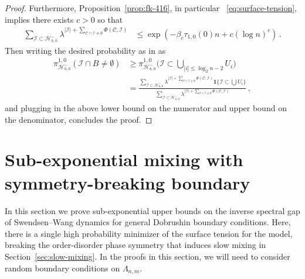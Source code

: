 \documentclass[reqno,11pt]{amsart}
\numberwithin{equation}{section}
\theoremstyle{definition}{
\newtheorem{example}[theorem]{Example}
\newtheorem{definition}[theorem]{Definition}
\newtheorem*{definition*}{Definition}
\newtheorem{problem}[theorem]{Problem}
\newtheorem{question}[theorem]{Question}
\newtheorem{remark}[theorem]{Remark}
}
\begin{document}
\begin{proof}
Furthermore, Proposition~\ref{prop:fk-416}, in particular ~\eqref{eq:surface-tension}, implies there exists $c>0$ so that
\begin{align*}
\sum _{\mathcal I \subset \mathcal H_{h,0}^-} \lambda^{|\mathcal I|+\sum_{\mathcal C\cap \mathcal I \neq \emptyset} \Phi(\mathcal C,\mathcal I)} & 
\leq \exp( -\beta_c \tau_{1,0}(0) n+ c(\log n)^c)\,.
\end{align*}
Then writing the desired probability as in \cite[(A.36)]{MaTo10} as
\begin{align*}
\pi_{\mathcal H^-_{h,0}}^{1,0}\left(\mathcal I \cap B \neq\emptyset\right) & \geq \pi_{\mathcal H^-_{h,0}}^{1,0} \Big(\mbox{$\mathcal I \subset \bigcup_{|i|\leq \log_2 n-2} U_i $}\Big) \\
& = \frac {\sum_{\mathcal I\subset \mathcal H^-_{h,0}} \lambda^{|\mathcal I|+\sum_{\mathcal C\cap \mathcal I \neq \emptyset} \Phi(\mathcal C,\mathcal I)}\boldsymbol 1\{\mathcal I \subset \bigcup U_i\}}{\sum_{\mathcal I\subset \mathcal H^-_{h,0}} \lambda^{|\mathcal I|+\sum_{\mathcal C\cap \mathcal I \neq \emptyset} \Phi(\mathcal C,\mathcal I)}}\,,
\end{align*}
and plugging in the above lower bound on the numerator and upper bound on the denominator, concludes the proof.
\end{proof}

\section{Sub-exponential mixing with symmetry-breaking boundary}

In this section we prove sub-exponential upper bounds on the inverse spectral gap of Swendsen--Wang dynamics for general Dobrushin boundary conditions. Here, there is a single high probability minimizer of the surface tension for the model, breaking the order-disorder phase symmetry that induces slow mixing in Section~\ref{sec:slow-mixing}. In the proofs in this section, we will need to consider random boundary conditions on $\Lambda_{n,m}$. 
\end{document}
